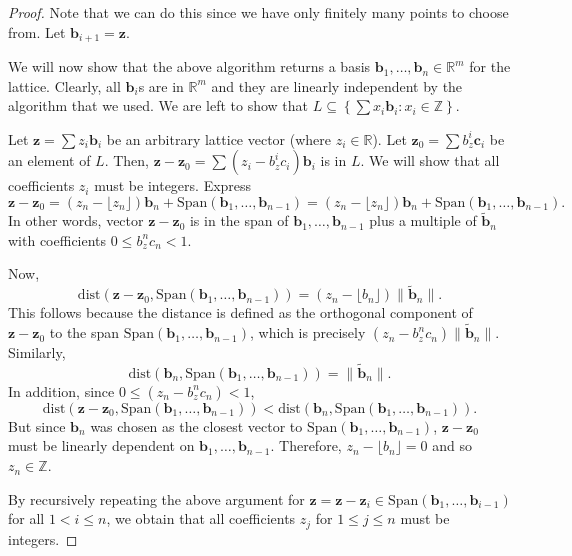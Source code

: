\begin{proof}
Note that we can do this since we have only finitely many points to choose from. Let \(\mathbf{b}_{i+1} = \mathbf{z}\).

We will now show that the above algorithm returns a basis \(\mathbf{b}_1, \ldots, \mathbf{b}_n \in \mathbb{R}^m\) for the lattice. Clearly, all \(\mathbf{b}_i\)s are in \(\mathbb{R}^m\) and they are linearly independent by the algorithm that we used. We are left to show that \(L \subseteq \left\{ \sum x_i \mathbf{b}_i : x_i \in \mathbb{Z} \right\}\).

Let \(\mathbf{z} = \sum z_i \mathbf{b}_i\) be an arbitrary lattice vector (where \(z_i \in \mathbb{R}\)). Let \(\mathbf{z}_0 = \sum b_z^i \mathbf{c}_i\) be an element of \(L\). Then, \(\mathbf{z} - \mathbf{z}_0 = \sum (z_i - b_z^i c_i) \mathbf{b}_i\) is in \(L\). We will show that all coefficients \(z_i\) must be integers. Express 
$$
\mathbf{z} - \mathbf{z}_0 = (z_n - \lfloor z_n \rfloor) \mathbf{b}_n + \text{Span}(\mathbf{b}_1, \ldots, \mathbf{b}_{n-1}) = (z_n - \lfloor z_n \rfloor) \mathbf{b}_n + \text{Span}(\mathbf{b}_1, \ldots, \mathbf{b}_{n-1}).
$$
In other words, vector \(\mathbf{z} - \mathbf{z}_0\) is in the span of \(\mathbf{b}_1, \ldots, \mathbf{b}_{n-1}\) plus a multiple of \(\tilde{\mathbf{b}}_n\) with coefficients \(0 \leq b_z^n c_n < 1\).

Now,
\[
\text{dist}(\mathbf{z} - \mathbf{z}_0, \text{Span}(\mathbf{b}_1, \ldots, \mathbf{b}_{n-1})) = (z_n - \lfloor b_n \rfloor) \|\tilde{\mathbf{b}}_n\|.
\]
This follows because the distance is defined as the orthogonal component of \(\mathbf{z} - \mathbf{z}_0\) to the span \(\text{Span}(\mathbf{b}_1, \ldots, \mathbf{b}_{n-1})\), which is precisely \((z_n - b_z^n c_n) \|\tilde{\mathbf{b}}_n\|\). Similarly,
\[
\text{dist}(\mathbf{b}_n, \text{Span}(\mathbf{b}_1, \ldots, \mathbf{b}_{n-1})) = \|\tilde{\mathbf{b}}_n\|.
\]
In addition, since \(0 \leq (z_n - b_z^n c_n) < 1\),
\[
\text{dist}(\mathbf{z} - \mathbf{z}_0, \text{Span}(\mathbf{b}_1, \ldots, \mathbf{b}_{n-1})) < \text{dist}(\mathbf{b}_n, \text{Span}(\mathbf{b}_1, \ldots, \mathbf{b}_{n-1})).
\]
But since \(\mathbf{b}_n\) was chosen as the closest vector to \(\text{Span}(\mathbf{b}_1, \ldots, \mathbf{b}_{n-1})\), \(\mathbf{z} - \mathbf{z}_0\) must be linearly dependent on \(\mathbf{b}_1, \ldots, \mathbf{b}_{n-1}\). Therefore, \(z_n - \lfloor b_n \rfloor= 0\) and so \(z_n \in \mathbb{Z}\).

By recursively repeating the above argument for \(\mathbf{z} = \mathbf{z} - \mathbf{z}_i \in \text{Span}(\mathbf{b}_1, \ldots, \mathbf{b}_{i-1})\) for all \(1 < i \leq n\), we obtain that all coefficients \(z_j\) for \(1 \leq j \leq n\) must be integers.

\end{proof}

